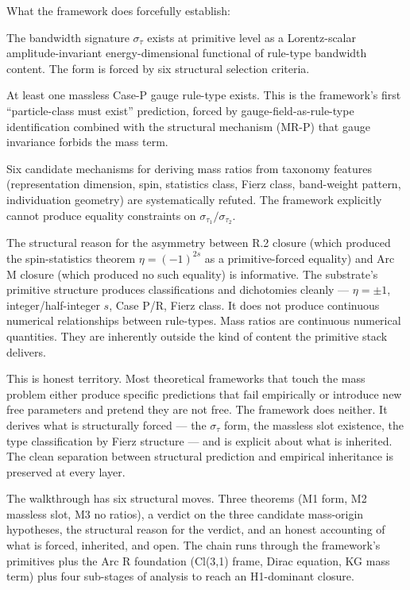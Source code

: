 \documentclass[11pt,a4paper]{article}
\begin{document}
What the framework does forcefully establish:

The bandwidth signature $\sigma_\tau$ exists at primitive level as a Lorentz-scalar amplitude-invariant energy-dimensional functional of rule-type bandwidth content. The form is forced by six structural selection criteria.

At least one massless Case-P gauge rule-type exists. This is the framework's first ``particle-class must exist'' prediction, forced by gauge-field-as-rule-type identification combined with the structural mechanism (MR-P) that gauge invariance forbids the mass term.

Six candidate mechanisms for deriving mass ratios from taxonomy features (representation dimension, spin, statistics class, Fierz class, band-weight pattern, individuation geometry) are systematically refuted. The framework explicitly cannot produce equality constraints on $\sigma_{\tau_1}/\sigma_{\tau_2}$.

The structural reason for the asymmetry between R.2 closure (which produced the spin-statistics theorem $\eta = (-1)^{2s}$ as a primitive-forced equality) and Arc M closure (which produced no such equality) is informative. The substrate's primitive structure produces classifications and dichotomies cleanly --- $\eta = \pm 1$, integer/half-integer $s$, Case P/R, Fierz class. It does not produce continuous numerical relationships between rule-types. Mass ratios are continuous numerical quantities. They are inherently outside the kind of content the primitive stack delivers.

This is honest territory. Most theoretical frameworks that touch the mass problem either produce specific predictions that fail empirically or introduce new free parameters and pretend they are not free. The framework does neither. It derives what is structurally forced --- the $\sigma_\tau$ form, the massless slot existence, the type classification by Fierz structure --- and is explicit about what is inherited. The clean separation between structural prediction and empirical inheritance is preserved at every layer.

The walkthrough has six structural moves. Three theorems (M1 form, M2 massless slot, M3 no ratios), a verdict on the three candidate mass-origin hypotheses, the structural reason for the verdict, and an honest accounting of what is forced, inherited, and open. The chain runs through the framework's primitives plus the Arc R foundation (Cl(3,1) frame, Dirac equation, KG mass term) plus four sub-stages of analysis to reach an H1-dominant closure.
\end{document}
